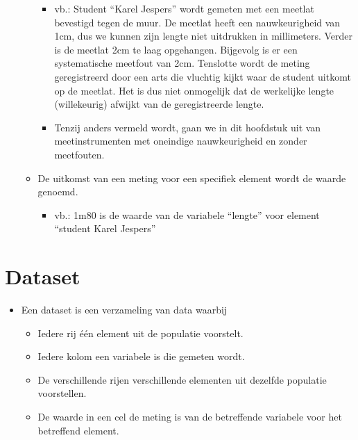 \documentclass[]{memoir}
\providecommand{\tightlist}{%
  \setlength{\itemsep}{0pt}\setlength{\parskip}{0pt}}
\begin{document}
\begin{itemize}
\begin{itemize}
    \begin{itemize}
    \tightlist
    \item
      vb.: Student ``Karel Jespers'' wordt gemeten met een meetlat bevestigd tegen de muur. De meetlat heeft een nauwkeurigheid van 1cm, dus we kunnen zijn lengte niet uitdrukken in millimeters. Verder is de meetlat 2cm te laag opgehangen. Bijgevolg is er een systematische meetfout van 2cm. Tenslotte wordt de meting geregistreerd door een arts die vluchtig kijkt waar de student uitkomt op de meetlat. Het is dus niet onmogelijk dat de werkelijke lengte (willekeurig) afwijkt van de geregistreerde lengte.
    \item
      Tenzij anders vermeld wordt, gaan we in dit hoofdstuk uit van meetinstrumenten met oneindige nauwkeurigheid en zonder meetfouten.
    \end{itemize}
  \item
    De uitkomst van een meting voor een specifiek element wordt de waarde genoemd.

    \begin{itemize}
    \tightlist
    \item
      vb.: 1m80 is de waarde van de variabele ``lengte'' voor element ``student Karel Jespers''
    \end{itemize}
  \end{itemize}
\end{itemize}

\hypertarget{dataset}{%
\section{Dataset}\label{dataset}}

\begin{itemize}
\tightlist
\item
  Een dataset is een verzameling van data waarbij

  \begin{itemize}
  \tightlist
  \item
    Iedere rij één element uit de populatie voorstelt.
  \item
    Iedere kolom een variabele is die gemeten wordt.
  \item
    De verschillende rijen verschillende elementen uit dezelfde populatie voorstellen.
  \item
    De waarde in een cel de meting is van de betreffende variabele voor het betreffend element.
  \end{itemize}
\end{itemize}
\end{document}
